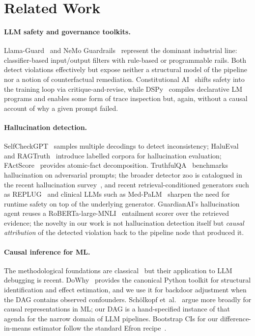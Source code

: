 \documentclass[11pt,letterpaper]{article}
\begin{document}
\section{Related Work}
\label{sec:related}

\paragraph{LLM safety and governance toolkits.}
Llama-Guard~\cite{inan2023llamaguard} and NeMo
Guardrails~\cite{rebedea2023nemo} represent the dominant industrial
line: classifier-based input/output filters with rule-based or
programmable rails.  Both detect violations effectively but expose
neither a structural model of the pipeline nor a notion of
counterfactual remediation.  Constitutional AI~\cite{bai2022constitutional}
shifts safety into the training loop via critique-and-revise, while
DSPy~\cite{khattab2023dspy} compiles declarative LM programs and
enables some form of trace inspection but, again, without a causal
account of why a given prompt failed.

\paragraph{Hallucination detection.}
SelfCheckGPT~\cite{manakul2023selfcheckgpt} samples multiple decodings
to detect inconsistency; HaluEval~\cite{li2023halueval} and
RAGTruth~\cite{niu2024ragtruth} introduce labelled corpora for
hallucination evaluation; FActScore~\cite{min2023factscore} provides
atomic-fact decomposition.  TruthfulQA~\cite{lin2022truthfulqa}
benchmarks hallucination on adversarial prompts; the broader detector
zoo is catalogued in the recent hallucination
survey~\cite{ji2023halu_survey}, and recent retrieval-conditioned
generators such as REPLUG~\cite{shi2024replug} and clinical LLMs
such as Med-PaLM~\cite{singhal2023medpalm} sharpen the need for
runtime safety on top of the underlying generator.  GuardianAI's hallucination agent reuses a
RoBERTa-large-MNLI~\cite{liu2019roberta,williams2018mnli} entailment
scorer over the retrieved evidence; the novelty in our work is not
hallucination detection itself but \emph{causal attribution} of the
detected violation back to the pipeline node that produced it.

\paragraph{Causal inference for ML.}
The methodological foundations are
classical~\cite{pearl1995ate,rubin1974potential,spirtes2000causation,pearl2009causality,pearl2018book}
but their application to LLM debugging is recent.
DoWhy~\cite{sharma2020dowhy} provides the canonical Python toolkit for
structural identification and effect estimation, and we use it for
backdoor adjustment when the DAG contains observed confounders.  Sch\"olkopf
et~al.~\cite{scholkopf2021causal} argue more broadly for causal
representations in ML; our DAG is a hand-specified instance of that
agenda for the narrow domain of LLM pipelines.  Bootstrap CIs for our
difference-in-means estimator follow the standard Efron
recipe~\cite{efron1979bootstrap}.
\end{document}
